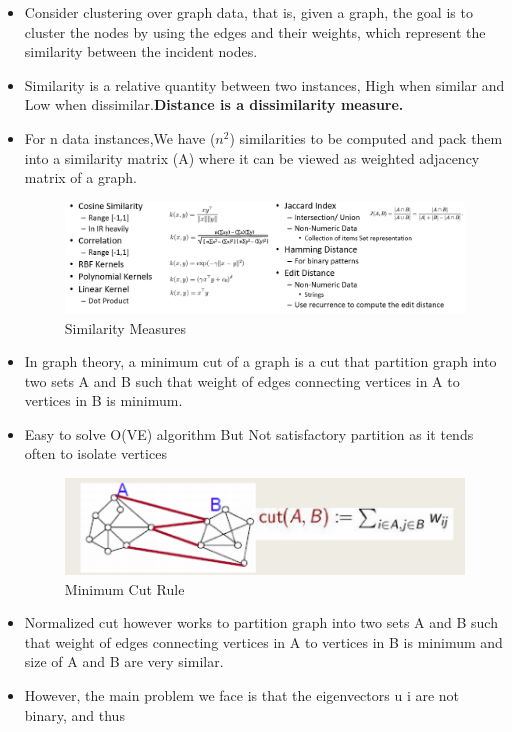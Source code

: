 \begin{itemize}
    \item Consider clustering over graph data, that is, given a graph, the goal is to cluster the nodes by using the edges and their weights, which represent the similarity between the incident nodes.
    \item Similarity is a relative quantity between two instances, High when similar and Low when dissimilar.\textbf{Distance is a dissimilarity measure.}
    \item For n data instances,We have ($n^2$) similarities to be computed and pack them into a similarity matrix (A) where it can be viewed as weighted adjacency matrix of a graph.
    \begin{figure}[H]
        \centerline{\includegraphics[width=1.5\textwidth]{Figures/sim.png}}
        \caption{\label{fig:figure5}Similarity Measures}
    \end{figure}
    \item In graph theory, a minimum cut of a graph is a cut that partition graph into two sets A and B such that weight of edges connecting vertices in A to vertices in B is minimum.
    \item Easy to solve O(VE) algorithm But Not satisfactory partition as it tends often to isolate vertices
    \begin{figure}[H]
        \centerline{\includegraphics[width=\textwidth]{Figures/mincut.png}}
        \caption{\label{fig:figure6}Minimum Cut Rule}
    \end{figure}
    \item Normalized cut however works to partition graph into two sets A and B such that weight of edges connecting vertices in A to vertices in B is minimum and size of A and B are very similar.
    \item However, the main problem we face is that the eigenvectors u i are not binary, and thus

\end{itemize}
